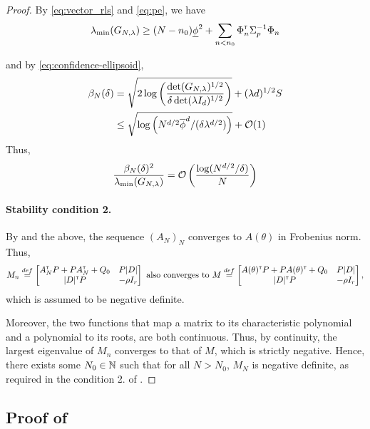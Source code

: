 \documentclass{article}
\begin{document}
\begin{proof}
	By \eqref{eq:vector_rls} and \eqref{eq:pe}, we have $$\lambda_{\min}(G_{N,\lambda}) \geq (N-n_0)\underline{\phi}^2 + \sum_{n<n_0}\Phi_{n}^{\mathsf{\scriptscriptstyle T}}\Sigma_{p}^{-1}\Phi_{n}$$
	
	and by \eqref{eq:confidence-ellipsoid},
	\begin{align*}
	\beta_N(\delta) &= \sqrt{2\log \left(\frac{\det(G_{N,\lambda})^{1/2}}{\delta\det(\lambda I_d)^{1/2}}\right)}
	+ (\lambda d)^{1/2}S\\
	&\leq \sqrt{\log \left(N^{d/2}\overline{\phi}^d / (\delta\lambda^{d/2})\right)} + \mathcal{O}(1)
	\end{align*}
	Thus,
	\[
	\frac{\beta_N(\delta)^2}{\lambda_{\min}(G_{N,\lambda})} = \mathcal{O}\left(\frac{\log (N^{d/2}/\delta)}{N} \right)
	\]
	
\paragraph{Stability condition 2.}

By  and the above, the sequence $(A_N)_{N}$ converges to $A(\theta)$ in Frobenius norm. Thus, 
$$M_n \stackrel{def}{=} \begin{bmatrix}
A_N^{\mathsf{\scriptscriptstyle T}} P + P A_N^{\mathsf{\scriptscriptstyle T}} + Q_0 & P|D|  \\
|D|^{\mathsf{\scriptscriptstyle T}} P & -\rho I_r \\
\end{bmatrix}\text{ also converges to } M\stackrel{def}{=}\begin{bmatrix}
A(\theta)^{\mathsf{\scriptscriptstyle T}} P + P A(\theta)^{\mathsf{\scriptscriptstyle T}} + Q_0 & P|D|  \\
|D|^{\mathsf{\scriptscriptstyle T}} P & -\rho I_r \\
\end{bmatrix},$$ which is assumed to be negative definite.

Moreover, the two functions that map a matrix to its characteristic polynomial and a polynomial to its roots, are both continuous. Thus, by continuity, the largest eigenvalue of $M_n$ converges to that of $M$, which is strictly negative. Hence, there exists some $N_0\in\mathbb{N}$ such that for all $N>N_0$, $M_N$ is negative definite, as required in the condition 2. of .
\end{proof}


\subsection{Proof of }
\end{document}
